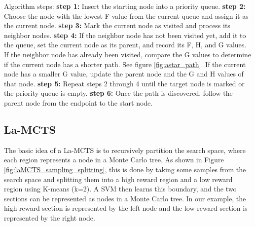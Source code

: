 \documentclass[bibliography=totoc]{scrartcl}
\begin{document}
Algorithm steps: \cite{app9061057} \newline
\textbf{step 1:} Insert the starting node into a priority queue.
\newline
\textbf{step 2:} Choose the node with the lowest F value from the current queue and assign it as the current node.
\newline
\textbf{step 3:} Mark the current node as visited and process its neighbor nodes.
\newline
\textbf{step 4:} If the neighbor node has not been visited yet, add it to the queue, set the current node as its parent, and record its F, H, and G values.
If the neighbor node has already been visited, compare the G values to determine if the current node has a shorter path. See figure \ref{fig:astar_path}.
If the current node has a smaller G value, update the parent node and the G and H values of that node.
\newline
\textbf{step 5:} Repeat steps 2 through 4 until the target node is marked or the priority queue is empty.
\newline
\textbf{step 6:} Once the path is discovered, follow the parent node from the endpoint to the start node.





\newpage
\subsection{La-MCTS}
The basic idea of a \ac{La-MCTS} is to recursively partition the search space, where each region represents a node in a Monte Carlo tree.\cite{La-MCTS}
As shown in Figure \ref{fig:laMCTS_sampling_splitting}, this is done by taking some samples from the search space and splitting them into a high reward region and a low reward region using K-means (k=2).
A \ac{SVM} then learns this boundary, and the two sections can be represented as nodes in a Monte Carlo tree.
In our example, the high reward section is represented by the left node and the low reward section is represented by the right node.
\end{document}
